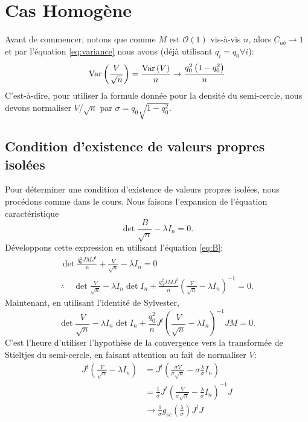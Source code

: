 \documentclass[../../main.tex]{subfiles} %
\begin{document}
\section{Cas Homogène}
Avant de commencer, notons que comme $M$ est $\mathcal{O}(1)$ vis-à-vis $n$, 
alors $C_{ab} \rightarrow 1$ et par l'équation \ref{eq:variance} nous avons 
(déjà utilisant $q_i = q_0 \forall i$):
\begin{equation*}
	\operatorname{Var} \left( \frac{V}{\sqrt n} \right) = \frac{\operatorname{Var} \left( V \right)}{n} \rightarrow \frac{q_0^2 
	\left(1 - q_0^2 \right)}{n} 
\end{equation*}
C'est-à-dire, pour utiliser la formule donnée pour la densité du semi-cercle, 
nous devons normaliser $V / \sqrt n$ par $\sigma = q_0 \sqrt{1 - q_0^2}$.

\subsection{Condition d'existence de valeurs propres isolées} 
Pour déterminer une condition d'existence de valeurs propres isolées, 
nous procédons comme dans le cours. Nous faisons l'expansion de l'équation 
caractéristique
\begin{equation*}
	\det{\frac{B}{\sqrt n} - \lambda I_n} = 0.
\end{equation*}
Développons cette expression en utilisant l'équation \ref{eq:B}:
\begin{equation*}
\begin{gathered}
\det{
	\frac{q_0^2 J M J^t}{n} + \frac{V}{\sqrt n} - \lambda I_n
} = 0 \\
\therefore \quad \det{\frac{V}{\sqrt n} - \lambda I_n} \det{
	I_n + \frac{q_0^2 J M J^t}{n} \left( \frac{V}{\sqrt n} 
	- \lambda I_n \right)^{-1}
} = 0.
\end{gathered}
\end{equation*}
Maintenant, en utilisant l'identité de Sylvester,
\begin{equation*}
\det{\frac{V}{\sqrt n} - \lambda I_n} \det{
	I_n + \frac{q_0^2}{n} J^t \left( \frac{V}{\sqrt n} 
	- \lambda I_n \right)^{-1} J M
} = 0.
\end{equation*}
C'est l'heure d'utiliser l'hypothèse de la convergence vers la transformée de 
Stieltjes du semi-cercle, en faisant attention au fait de normaliser $V$:
\begin{align}
	J^t \left( \frac{V}{\sqrt n} - \lambda I_n \right) 
	&= J^t \left( \frac{\sigma V}{\sigma \sqrt n} - \sigma 
	\frac{\lambda}{\sigma} I_n \right) \nonumber \\
	&= \frac{1}{\sigma} J^t \left( \frac{V}{\sigma \sqrt n} 
	- \frac{\lambda}{\sigma} I_n \right)^{-1} J \nonumber \\
	&\rightarrow \frac{1}{\sigma} g_{sc} 
	\left( \frac{\lambda}{\sigma} \right) J^t J
	\label{eq:norm_iso}
\end{align}
\end{document}
